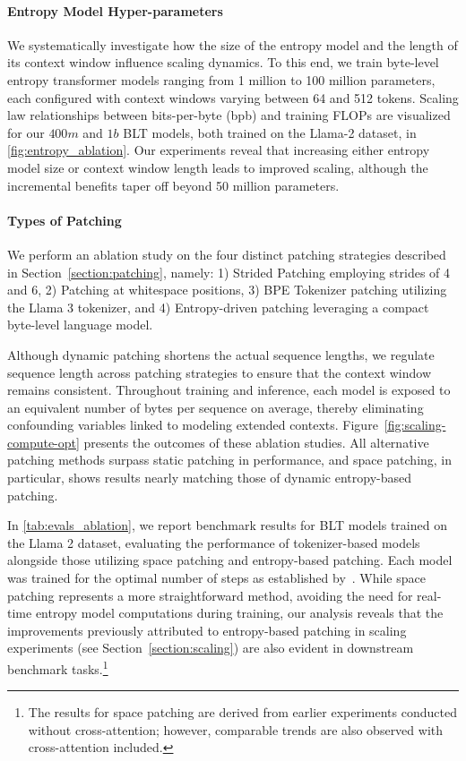 \paragraph{Entropy Model Hyper-parameters} We systematically investigate how the size of the entropy model and the length of its context window influence scaling dynamics. To this end, we train byte-level entropy transformer models ranging from 1 million to 100 million parameters, each configured with context windows varying between 64 and 512 tokens. Scaling law relationships between bits-per-byte (bpb) and training FLOPs are visualized for our $400m$ and $1b$ {\textsc BLT} models, both trained on the Llama-2 dataset, in \autoref{fig:entropy_ablation}. Our experiments reveal that increasing either entropy model size or context window length leads to improved scaling, although the incremental benefits taper off beyond 50 million parameters.

\paragraph{Types of Patching}

We perform an ablation study on the four distinct patching strategies described in Section~\ref{section:patching}, namely: 1) Strided Patching employing strides of 4 and 6, 2) Patching at whitespace positions, 3) BPE Tokenizer patching utilizing the Llama 3 tokenizer, and 4) Entropy-driven patching leveraging a compact byte-level language model.

Although dynamic patching shortens the actual sequence lengths, we regulate sequence length across patching strategies to ensure that the context window remains consistent. Throughout training and inference, each model is exposed to an equivalent number of bytes per sequence on average, thereby eliminating confounding variables linked to modeling extended contexts. Figure~\ref{fig:scaling-compute-opt} presents the outcomes of these ablation studies. All alternative patching methods surpass static patching in performance, and space patching, in particular, shows results nearly matching those of dynamic entropy-based patching.

In \autoref{tab:evals_ablation}, we report benchmark results for {\textsc BLT} models trained on the Llama 2 dataset, evaluating the performance of tokenizer-based models alongside those utilizing space patching and entropy-based patching. Each model was trained for the optimal number of steps as established by~\citet{dubey2024llama}. While space patching represents a more straightforward method, avoiding the need for real-time entropy model computations during training, our analysis reveals that the improvements previously attributed to entropy-based patching in scaling experiments (see Section~\ref{section:scaling}) are also evident in downstream benchmark tasks.\footnote{The results for space patching are derived from earlier experiments conducted without cross-attention; however, comparable trends are also observed with cross-attention included.}

